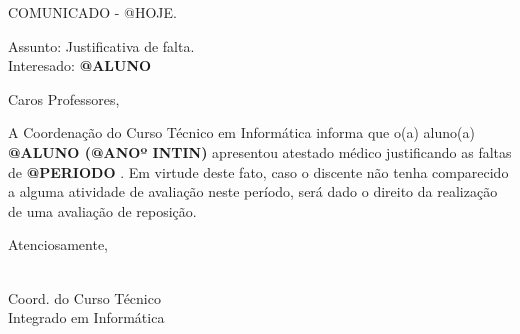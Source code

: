 \documentclass[a5paper, 12pt]{letter}
\begin{document}
\noindent COMUNICADO - @HOJE.

\noindent Assunto: Justificativa de falta.\\
Interesado: {\bf @ALUNO }

\noindent Caros Professores,

\onehalfspacing A Coordenação do Curso Técnico em Informática informa que o(a) aluno(a) {\bf @ALUNO (@ANOº INTIN) } apresentou atestado médico justificando as faltas de {\bf @PERIODO }. Em virtude deste fato, caso o discente não tenha comparecido a alguma atividade de avaliação neste período, será dado o direito da realização de uma avaliação de reposição.

\noindent Atenciosamente,

\begin{flushright}
\\
\indent Coord. do Curso Técnico\\
\indent Integrado em Informática\\
\end{flushright}
\end{document}
